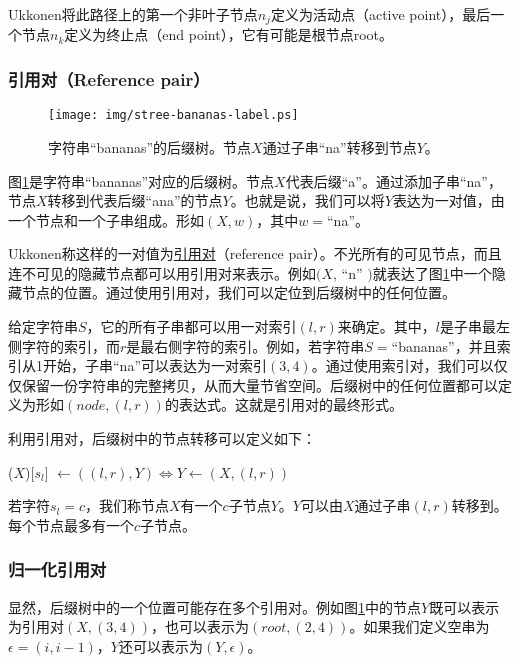 \documentclass{ctexart}
\begin{document}
Ukkonen将此路径上的第一个非叶子节点$n_j$定义为活动点（active point），最后一个节点$n_k$定义为终止点（end point），它有可能是根节点root。

\subsubsection{引用对（Reference pair）}

\begin{figure}[htbp]
  \centering
  \texttt{[image: img/stree-bananas-label.ps]}
  \caption{字符串“bananas”的后缀树。节点$X$通过子串“na”转移到节点$Y$。}
  \label{fig:stree-bananas-label}
\end{figure}

图\ref{fig:stree-bananas-label}是字符串“bananas”对应的后缀树。节点$X$代表后缀“a”。通过添加子串“na”，节点$X$转移到代表后缀“ana”的节点$Y$。也就是说，我们可以将$Y$表达为一对值，由一个节点和一个子串组成。形如$(X, w)$，其中$w=$“na”。

Ukkonen称这样的一对值为\underline{引用对}（reference pair）。不光所有的可见节点，而且连不可见的隐藏节点都可以用引用对来表示。例如$(X$, “n” $)$就表达了图\ref{fig:stree-bananas-label}中一个隐藏节点的位置。通过使用引用对，我们可以定位到后缀树中的任何位置。

给定字符串$S$，它的所有子串都可以用一对索引$(l, r)$来确定。其中，$l$是子串最左侧字符的索引，而$r$是最右侧字符的索引。例如，若字符串$S=$“bananas”，并且索引从1开始，子串“na”可以表达为一对索引$(3, 4)$。通过使用索引对，我们可以仅仅保留一份字符串的完整拷贝，从而大量节省空间。后缀树中的任何位置都可以定义为形如$(node, (l, r))$的表达式。这就是引用对的最终形式。

利用引用对，后缀树中的节点转移可以定义如下：

($X$)[$s_l$] $\gets ((l, r), Y) \iff Y \gets (X, (l, r))$

若字符$s_l=c$，我们称节点$X$有一个$c$子节点$Y$。$Y$可以由$X$通过子串$(l, r)$转移到。每个节点最多有一个$c$子节点。

\subsubsection{归一化引用对}

显然，后缀树中的一个位置可能存在多个引用对。例如图\ref{fig:stree-bananas-label}中的节点$Y$既可以表示为引用对$(X, (3, 4))$，也可以表示为$(root, (2, 4))$。如果我们定义空串为$\epsilon=(i, i-1)$，$Y$还可以表示为$(Y, \epsilon)$。
\end{document}
